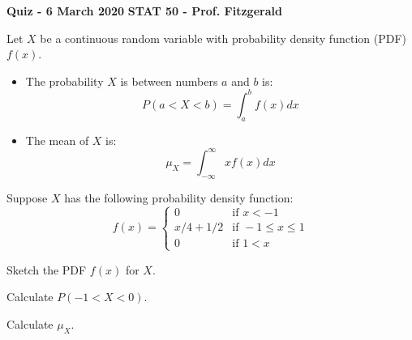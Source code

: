 \documentclass[12pt, addpoints]{exam}
\begin{document}
\textbf{Quiz - 6 March 2020}
\hfill
\textbf{STAT 50 - Prof. Fitzgerald}

\vspace{10mm}
 

\vspace{5mm}

Let $X$ be a continuous random variable with probability density function (PDF) $f(x)$.

\begin{itemize}

\item
The probability $X$ is between numbers $a$ and $b$ is:
\[
P(a < X < b) = \int_a^b f(x) dx
\]

\item
The mean of $X$ is:
\[
\mu_X = \int_{-\infty}^{\infty} x f(x) dx
\]

\end{itemize}

\vspace{5mm}

Suppose $X$ has the following probability density function:
\[
f(x) = 
\begin{cases} 
0           &\mbox{if } x < -1 \\
x/4 + 1/2   &\mbox{if } -1 \leq x \leq 1 \\
0           & \mbox{if } 1 < x \end{cases}
\]

\begin{questions}

\question[3]
Sketch the PDF $f(x)$ for $X$.

\question[3]
Calculate $P(-1 < X < 0)$.

\question[4]
Calculate $\mu_X$.

\end{questions}
\newpage
\begin{center}
\gradetable[v][questions]
\end{center}
\end{document}
